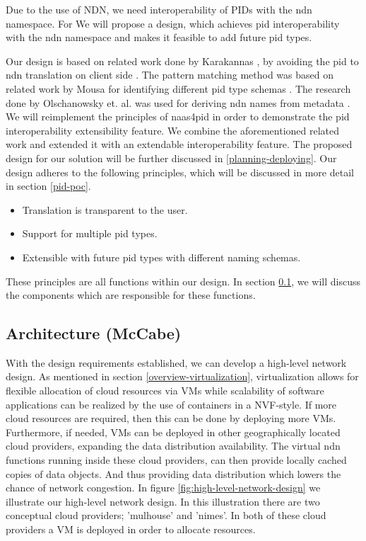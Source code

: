 Due to the use of NDN, we need interoperability of PIDs with the \gls{ndn} namespace. For 
We will propose a design, which achieves \gls{pid} interoperability with the \gls{ndn} namespace and makes it feasible to add future \gls{pid} types.



Our design is based on related work done by Karakannas \cite{icn-bd}, by avoiding the \gls{pid} to \gls{ndn} translation on client side \cite{icn-bd}. The pattern matching method was based on related work by Mousa for identifying different \gls{pid} type schemas \cite{ndn-app-aware}. The research done by Olschanowsky et. al. was used for deriving \gls{ndn} names from metadata \cite{ndn-man}.
We will reimplement the principles of \gls{naas4pid} in order to demonstrate the \gls{pid} interoperability extensibility feature.
We combine the aforementioned related work and extended it with an extendable interoperability feature. The proposed design for our solution will be further discussed in \ref{planning-deploying}.
Our design adheres to the following principles, which will be discussed in more detail in section \ref{pid-poc}.
 
\begin{itemize}
    \item{Translation is transparent to the user.}
    \item{Support for multiple \gls{pid} types.}
    \item{Extensible with future \gls{pid} types with different naming schemas.}
\end{itemize}

These principles are all functions within our design. In section \ref{planning-architecture}, we will discuss the components which are responsible for these functions.

\subsection{Architecture (McCabe)}
\label{planning-architecture}
With the design requirements established, we can develop a high-level network design. As mentioned in section \ref{overview-virtualization}, virtualization allows for flexible allocation of cloud resources via VMs while scalability of software applications can be realized by the use of containers in a NVF-style. If more cloud resources are required, then this can be done by deploying more VMs. Furthermore, if needed, VMs can be deployed in other geographically located cloud providers, expanding the data distribution availability. The virtual \gls{ndn} functions running inside these cloud providers, can then provide locally cached copies of data objects. And thus providing data distribution which lowers the chance of network congestion. In figure \ref{fig:high-level-network-design} we illustrate our high-level network design. In this illustration there are two conceptual cloud providers; 'mulhouse' and 'nimes'. In both of these cloud providers a VM is deployed in order to allocate resources.

